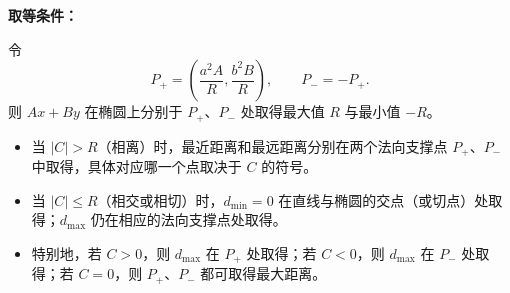 \begin{statementbox}
	\textbf{\textcolor{CStatement}{取等条件：}}

	令
	\[
		P_+=\left(\frac{a^2A}{R},\frac{b^2B}{R}\right),
		\qquad
		P_-=-P_+.
	\]
	则 \(Ax+By\) 在椭圆上分别于 \(P_+\)、\(P_-\) 处取得最大值 \(R\) 与最小值 \(-R\)。

	\begin{itemize}[leftmargin=*, itemsep=0.35em, topsep=0.4em]
		\item 当 \(|C|>R\)（相离）时，最近距离和最远距离分别在两个法向支撑点 \(P_+\)、\(P_-\) 中取得，具体对应哪一个点取决于 \(C\) 的符号。

		\item 当 \(|C|\le R\)（相交或相切）时，\(d_{\min}=0\) 在直线与椭圆的交点（或切点）处取得；\(d_{\max}\) 仍在相应的法向支撑点处取得。

		\item 特别地，若 \(C>0\)，则 \(d_{\max}\) 在 \(P_+\) 处取得；若 \(C<0\)，则 \(d_{\max}\) 在 \(P_-\) 处取得；若 \(C=0\)，则 \(P_+\)、\(P_-\) 都可取得最大距离。
	\end{itemize}

\end{statementbox}